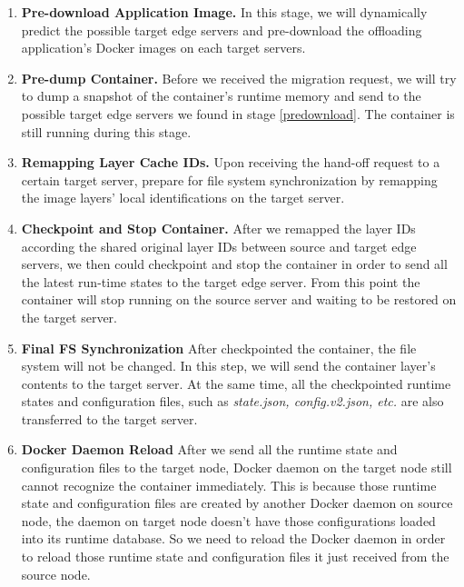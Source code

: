 \begin{enumerate}[label=\textbf{S\arabic*}]

\item \label{predownload}\textbf{Pre-download Application Image.} In this stage, we will dynamically predict the possible target edge servers and pre-download the offloading application's Docker images on each target servers.

\item \label{predump} \textbf{Pre-dump Container.} Before we received the migration request, we will try to dump a snapshot of the container's runtime memory and send to the possible target edge servers we found in stage \ref{predownload}. The container is still running during this stage. 

\item \label{prepare} \textbf{Remapping Layer Cache IDs.} Upon receiving the hand-off request to a certain target server, prepare for file system synchronization by remapping the image layers' local identifications on the target server.


\item \label{checkpoint} \textbf{Checkpoint and Stop Container.} After we remapped the layer IDs according the shared original layer IDs between source and target edge servers, we then could checkpoint and stop the container in order to send all the latest run-time states to the target edge server.
From this point the container will stop running on the source server and waiting to be restored on the target server.

\item \label{fs-sync} \textbf{Final FS Synchronization} After checkpointed the container, the file system will not be changed. In this step, we will send the container layer's contents to the target server. At the same time, all the checkpointed runtime states and configuration files, such as \textit{state.json, config.v2.json, etc.} are also transferred to the target server. 

\item \label{daemon-Reload} \textbf{Docker Daemon Reload} After we send all the runtime state and configuration files to the target node, Docker daemon on the target node still cannot recognize the container immediately.  This is because those runtime state and configuration files are created by another Docker daemon on source node, the daemon on target node doesn't have those configurations loaded into its runtime database. So we need to reload the Docker daemon in order to reload those runtime state and configuration files it just received from the source node.


\end{enumerate}
